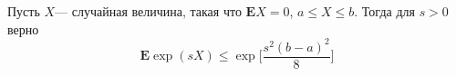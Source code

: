 \begin{comment}
\begin{problem}
Пусть $\xi_t$ ~--- гауссовские случайные величины с нулевым средним и $\mathbf{E}\xi_t^2 = \sigma^2_t\leq\sigma$. Тогда 
\begin{equation*}
\mathbf{E}\max_{t\in T}\xi_t \leq \sqrt{2\sigma^2\log(n)},
\end{equation*}
здесь $n = \#T$~--- число элементов $T$.
\end{problem}
\begin{remark}
Основная идея доказательства: если случайные величины $\xi'_t>0$ имеют тяжелые хвосты, то 
\begin{equation*}
\max_{t\in T} \xi'_t \asymp \sum_{t\in T}\xi'_t.
\end{equation*}

Для любого $\lambda>0$ 
\begin{equation*}
\max_{t\in T} \xi_t = \lambda^{-1}\log\big[\max_{t\in T} \rm e^{\lambda \xi_t}\bigr]\leq \lambda^{-1}\log\big[\sum_{t\in T}\rm e^{\lambda \xi_t}\bigr].
\end{equation*}
Воспользоваться далее неравенством Йенсена и получить
\begin{equation*}
\begin{split}
\mathbf{E}\max_{t\in T} \xi_t \leq \frac{\log(n)}{\lambda} + \frac{\sigma^2\lambda}{2}.
\end{split}
\end{equation*}

Минимизировать по $\lambda$.

\end{remark}
\end{comment}

\begin{problem} Пусть $X$--- случайная величина, такая что $\mathbf{E}X =0$, $a\leq X\leq b$. Тогда для $s>0$ верно
\begin{equation*}
\mathbf{E}\exp(s X)\leq \exp\bigg[\frac{s^2(b-a)^2}{8}\biggr]
\end{equation*}
\end{problem}


